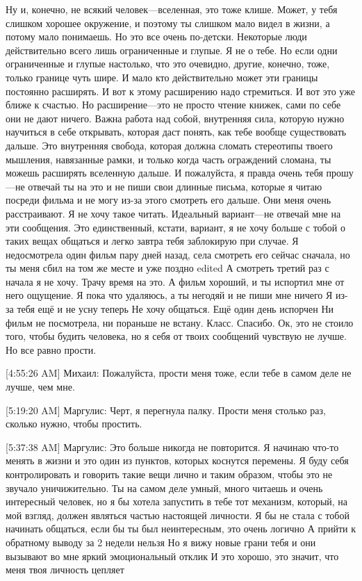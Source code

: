 \documentclass{article}
\begin{document}
 Ну и, конечно, не всякий человек—вселенная, это тоже клише. Может, у тебя слишком хорошее окружение, и поэтому ты слишком мало видел в жизни, а потому мало понимаешь. Но это все очень по-детски. Некоторые люди действительно всего лишь ограниченные и глупые. Я не о тебе. Но если одни ограниченные и глупые настолько, что это очевидно, другие, конечно, тоже, только границе чуть шире. И мало кто действительно может эти границы постоянно расширять. И вот к этому расширению надо стремиться. И вот это уже ближе к счастью. Но расширение—это не просто чтение книжек, сами по себе они не дают ничего. Важна работа над собой, внутренняя сила, которую нужно научиться в себе открывать, которая даст понять, как тебе вообще существовать дальше. Это внутренняя свобода, которая должна сломать стереотипы твоего мышления, навязанные рамки, и только когда часть ограждений сломана, ты можешь расширять вселенную дальше.
 И пожалуйста, я правда очень тебя прошу—не отвечай ты на это и не пиши свои длинные письма, которые я читаю посреди фильма и не могу из-за этого смотреть его дальше. Они меня очень расстраивают. Я не хочу такое читать. Идеальный вариант—не отвечай мне на эти сообщения. Это единственный, кстати, вариант, я не хочу больше с тобой о таких вещах общаться и легко завтра тебя заблокирую при случае.
 Я недосмотрела один фильм пару дней назад, села смотреть его сейчас сначала, но ты меня сбил на том же месте и уже поздно
edited 
А смотреть третий раз с начала я не хочу. Трачу время на это. А фильм хороший, и ты испортил мне от него ощущение. Я пока что удаляюсь, а ты негодяй и не пиши мне ничего
 Я из-за тебя ещё и не усну теперь
 Не хочу общаться.
 Ещё один день испорчен
 Ни фильм не посмотрела, ни пораньше не встану. Класс. Спасибо.
 Ок, это не стоило того, чтобы будить человека, но я себя от твоих сообщений чувствую не лучше. Но все равно прости.

[4:55:26 AM] Михаил:
Пожалуйста, прости меня тоже, если тебе в самом деле не лучше, чем мне.

[5:19:20 AM] Маргулис:
Черт, я перегнула палку.
 Прости меня столько раз, сколько нужно, чтобы простить.

[5:37:38 AM] Маргулис:
Это больше никогда не повторится. Я начинаю что-то менять в жизни и это один из пунктов, которых коснутся перемены. Я буду себя контролировать и говорить такие вещи лично и таким образом, чтобы это не звучало уничижительно. Ты на самом деле умный, много читаешь и очень интересный человек, но я бы хотела запустить в тебе тот механизм, который, на мой взгляд, должен являться частью настоящей личности.
 Я бы не стала с тобой начинать общаться, если бы ты был неинтересным, это очень логично
 А прийти к обратному выводу за 2 недели нельзя
 Но я вижу новые грани тебя и они вызывают во мне яркий эмоциональный отклик
 И это хорошо, это значит, что меня твоя личность цепляет
\end{document}
